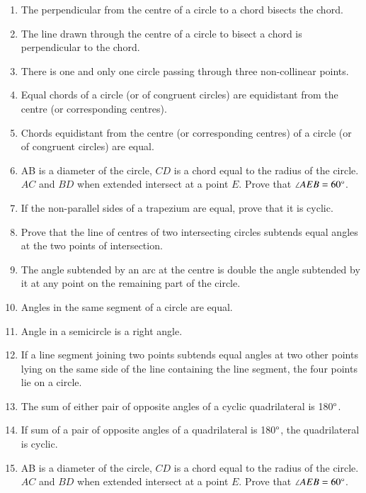 \begin{enumerate}[label=\thesubsection.\arabic*.,ref=\thesubsection.\theenumi]
\item  The perpendicular from the centre of a circle to a chord bisects the chord. 
\item  The line drawn through the centre of a circle to bisect a chord is perpendicular to the chord.
\item  There is one and only one circle passing through three non-collinear points. 
\item  Equal chords of a circle (or of congruent circles) are equidistant from the centre (or corresponding centres).
\item Chords equidistant from the centre (or corresponding centres) of a circle (or of congruent circles) are equal.
%
\item AB is a diameter of the circle, $CD$ is a chord equal to the radius of the circle. $AC$ and $BD$ when extended intersect at a point $E$. Prove that $\angle AEB = 60\degree$.
\item If the non-parallel sides of a trapezium are equal, prove that it is cyclic.
\item Prove that the line of centres of two intersecting circles subtends equal angles at the
two points of intersection.
\item  The angle subtended by an arc at the centre is double the angle subtended by it at any point on the remaining part of the circle.
\item Angles in the same segment of a circle are equal. \item  Angle in a semicircle is a right angle. 
\item  If a line segment joining two points subtends equal angles at two other points lying on the same side of the line containing the line segment, the four points lie on a circle. 
	\iffalse
\begin{enumerate}


\end{enumerate}
\fi
\item  The sum of either pair of opposite angles of a cyclic quadrilateral is 180$\degree$.
\item  If sum of a pair of opposite angles of a quadrilateral is 180$\degree$, the quadrilateral is cyclic.
%
\item AB is a diameter of the circle, $CD$ is a chord equal to the radius of the circle. $AC$ and $BD$ when extended intersect at a point $E$. Prove that $\angle AEB = 60\degree$.

\end{enumerate}
